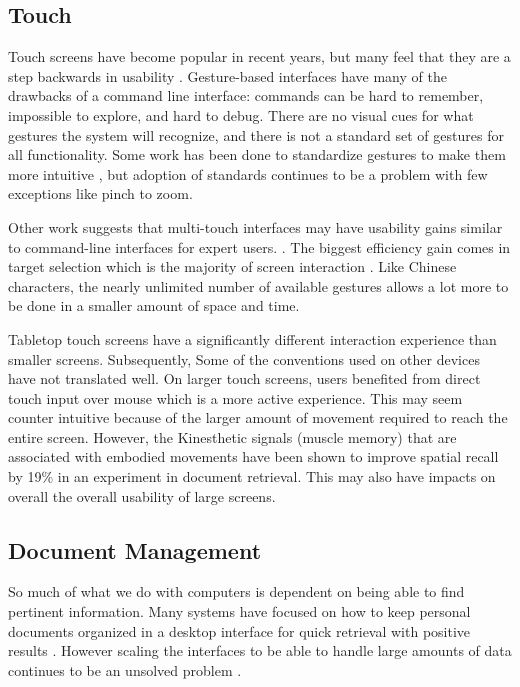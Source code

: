 \documentclass{article}
\begin{document}
\subsection{Touch}
Touch screens have become popular in recent years, but many feel that they are a step backwards in usability \cite{Norman2010}.  Gesture-based interfaces have many of the drawbacks of a command line interface: commands can be hard to remember, impossible to explore, and hard to debug.  There are no visual cues for what gestures the system will recognize, and there is not a standard set of gestures for all functionality.   Some work has been done to standardize gestures to make them more intuitive \cite{North2009}, but adoption of standards continues to be a problem with few exceptions like pinch to zoom.  

	Other work suggests that multi-touch interfaces may have usability gains similar to command-line interfaces for expert users. \cite{Forlines2007} \cite{Tan2002}\cite{North2009}. The biggest efficiency gain comes in target selection which is the majority of screen interaction \cite{Forlines2007}.  Like Chinese characters, the nearly unlimited number of available gestures allows a lot more to be done in a smaller amount of space and time.  
	
	Tabletop touch screens have a significantly different interaction experience than smaller screens.  Subsequently, Some of the conventions used on other devices have not translated well.  On larger touch screens, users benefited from direct touch input over mouse which is a more active experience\cite{Kristensson2008}.  This may seem counter intuitive because of the larger amount of movement required to reach the entire screen. However, the Kinesthetic signals (muscle memory) that are associated with embodied movements have been shown to improve spatial recall by 19\% in an experiment in document retrieval.\cite{Tan2002} This may also have impacts on overall the overall usability of large screens.


\subsection{Document Management}

So much of what we do with computers is dependent on being able to find pertinent information.  Many systems have focused on how to keep personal documents organized in a desktop interface for quick retrieval with positive results \cite{Agarawala2006} \cite{Foo2007:ECDL} \cite{Foo2007:ICADL}. However scaling the interfaces to be able to handle large amounts of data continues to be an unsolved problem \cite{Whittaker2001}.
\end{document}
